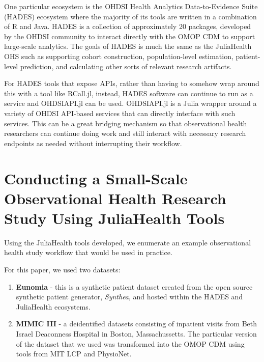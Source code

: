 \documentclass{juliacon}
\begin{document}
One particular ecosystem is the OHDSI Health Analytics Data-to-Evidence Suite (HADES) ecosystem where the majority of its tools are written in a combination of R and Java.
HADES is a collection of approximately 20 packages, developed by the OHDSI community to interact directly with the OMOP CDM to support large-scale analytics.
The goals of HADES is much the same as the JuliaHealth OHS such as supporting cohort construction, population-level estimation, patient-level prediction, and calculating other sorts of relevant research artifacts.

For HADES tools that expose APIs, rather than having to somehow wrap around this with a tool like RCall.jl, instead, HADES software can continue to run as a service and OHDSIAPI.jl can be used.
OHDSIAPI.jl is a Julia wrapper around a variety of OHDSI API-based services that can directly interface with such services.
This can be a great bridging mechanism so that observational health researchers can continue doing work and still interact with necessary research endpoints as needed without interrupting their workflow.

\section{Conducting a Small-Scale Observational Health Research Study Using JuliaHealth Tools}

Using the JuliaHealth tools developed, we enumerate an example observational health study workflow that would be used in practice.\footnotemark

For this paper, we used two datasets: 

\begin{enumerate}

\item \textbf{Eunomia} - this is a synthetic patient dataset created from the open source synthetic patient generator, \textit{Synthea}, and hosted within the HADES and JuliaHealth ecosystems. \cite{walonoski2018synthea}

\item \textbf{MIMIC III} - a deidentified datasets consisting of inpatient visits from Beth Israel Deaconness Hospital in Boston, Massachussetts.
The particular version of the dataset that we used was transformed into the OMOP CDM using tools from MIT LCP and PhysioNet. \cite{physionet, hripcsakCharacterizingTreatmentPathways2016, johnson2016mimic, johnson2018mimic}

\end{enumerate}
\end{document}
